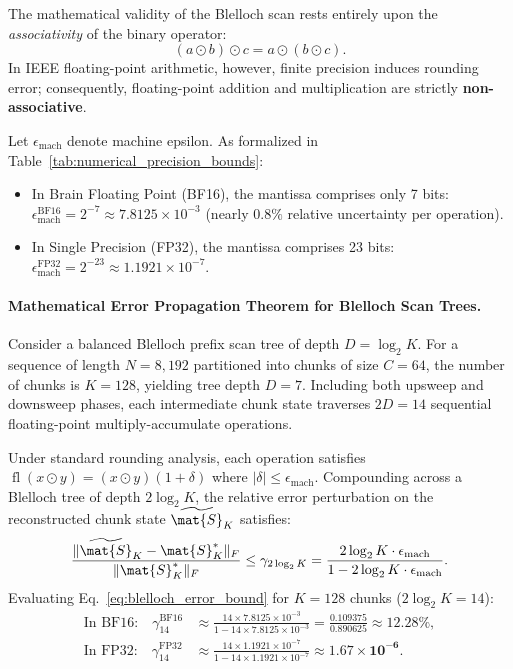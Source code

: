 The mathematical validity of the Blelloch scan rests entirely upon the \emph{associativity} of the binary operator:
\begin{equation}
    (a \odot b) \odot c = a \odot (b \odot c).
\end{equation}
In IEEE floating-point arithmetic, however, finite precision induces rounding error; consequently, floating-point addition and multiplication are strictly \textbf{non-associative}.

Let $\epsilon_{\text{mach}}$ denote machine epsilon. As formalized in Table~\ref{tab:numerical_precision_bounds}:
\begin{itemize}
    \item In Brain Floating Point (BF16), the mantissa comprises only 7 bits: $\epsilon_{\text{mach}}^{\text{BF16}} = 2^{-7} \approx 7.8125 \times 10^{-3}$ (nearly $0.8\%$ relative uncertainty per operation).
    \item In Single Precision (FP32), the mantissa comprises 23 bits: $\epsilon_{\text{mach}}^{\text{FP32}} = 2^{-23} \approx 1.1921 \times 10^{-7}$.
\end{itemize}

\paragraph{Mathematical Error Propagation Theorem for Blelloch Scan Trees.}
Consider a balanced Blelloch prefix scan tree of depth $D = \log_2 K$. For a sequence of length $N = 8{,}192$ partitioned into chunks of size $C = 64$, the number of chunks is $K = 128$, yielding tree depth $D = 7$. Including both upsweep and downsweep phases, each intermediate chunk state traverses $2D = 14$ sequential floating-point multiply-accumulate operations.

Under standard rounding analysis, each operation satisfies $\operatorname{fl}(x \odot y) = (x \odot y)(1 + \delta)$ where $|\delta| \le \epsilon_{\text{mach}}$. Compounding across a Blelloch tree of depth $2 \log_2 K$, the relative error perturbation on the reconstructed chunk state $\widetilde{\mat{S}}_K$ satisfies:
\begin{equation}
    \frac{\|\widetilde{\mat{S}}_K - \mat{S}_K^*\|_F}{\|\mat{S}_K^*\|_F} \le \gamma_{2 \log_2 K} = \frac{2 \log_2 K \cdot \epsilon_{\text{mach}}}{1 - 2 \log_2 K \cdot \epsilon_{\text{mach}}}.
    \label{eq:blelloch_error_bound}
\end{equation}
Evaluating Eq.~\eqref{eq:blelloch_error_bound} for $K = 128$ chunks ($2 \log_2 K = 14$):
\begin{align}
    \text{In BF16:} \quad \gamma_{14}^{\text{BF16}} &\approx \frac{14 \times 7.8125 \times 10^{-3}}{1 - 14 \times 7.8125 \times 10^{-3}} = \frac{0.109375}{0.890625} \approx \mathbf{12.28\%}, \\
    \text{In FP32:} \quad \gamma_{14}^{\text{FP32}} &\approx \frac{14 \times 1.1921 \times 10^{-7}}{1 - 14 \times 1.1921 \times 10^{-7}} \approx \mathbf{1.67 \times 10^{-6}}.
\end{align}

